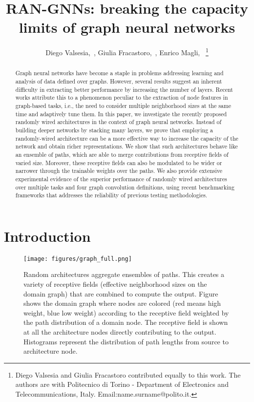\documentclass[10pt,twocolumn,twoside]{IEEEtran}
\title{RAN-GNNs: breaking the capacity limits of graph neural networks}
\author{Diego Valsesia,~\IEEEmembership{Member,~IEEE},
        Giulia Fracastoro,~\IEEEmembership{Member,~IEEE},
        Enrico Magli,~\IEEEmembership{Fellow,~IEEE} \thanks{Diego Valsesia and Giulia Fracastoro contributed equally to this work. The authors are with Politecnico di Torino - Department of Electronics and Telecommunications,  Italy.  Email:{name.surname}@polito.it.}  }
\begin{document}
\maketitle

\begin{abstract}
Graph neural networks have become a staple in problems addressing learning and analysis of data defined over graphs. However, several results suggest an inherent difficulty in extracting better performance by increasing the number of layers. Recent works attribute this to a phenomenon peculiar to the extraction of node features in graph-based tasks, i.e., the need to consider multiple neighborhood sizes at the same time and adaptively tune them. In this paper, we investigate the recently proposed randomly wired architectures in the context of graph neural networks. Instead of building deeper networks by stacking many layers, we prove that employing a randomly-wired architecture can be a more effective way to increase the capacity of the network and obtain richer representations. We show that such architectures behave like an ensemble of paths, which are able to merge contributions from receptive fields of varied size. Moreover, these receptive fields can also be modulated to be wider or narrower through the trainable weights over the paths. We also provide extensive experimental evidence of the superior performance of randomly wired architectures over multiple tasks and four graph convolution definitions, using recent benchmarking frameworks that addresses the reliability of previous testing methodologies.
\end{abstract}

\section{Introduction} \label{sec:intro}

\begin{figure*}[t]
    \centering
    \texttt{[image: figures/graph\_full.png]}
    \caption{Random architectures aggregate ensembles of paths. This creates a variety of receptive fields (effective neighborhood sizes on the domain graph) that are combined to compute the output. Figure shows the domain graph where nodes are colored (red means high weight, blue low weight) according to the receptive field weighted by the path distribution of a domain node. The receptive field is shown at all the architecture nodes directly contributing to the output. Histograms represent the distribution of path lengths from source to architecture node.}
    \label{fig:full}
\end{figure*}
\end{document}
